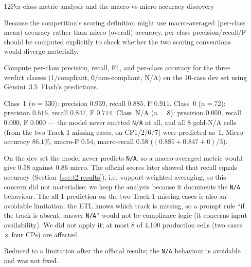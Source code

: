 \begin{explog}{12}{Per-class metric analysis and the macro-vs-micro accuracy discovery}
\item[Hypothesis] Because the competition's scoring definition might use macro-averaged (per-class mean) accuracy rather than micro (overall) accuracy, per-class precision/recall/F should be computed explicitly to check whether the two scoring conventions would diverge materially.
\item[Method] Compute per-class precision, recall, F1, and per-class accuracy for the three verdict classes (1/compliant, 0/non-compliant, N/A) on the 10-case dev set using Gemini~3.5~Flash's predictions.
\item[Result] Class~1 ($n=330$): precision $0.939$, recall $0.885$, F $0.911$. Class~0 ($n=72$): precision $0.616$, recall $0.847$, F $0.714$. Class~N/A ($n=8$): precision $0.000$, recall $0.000$, F $0.000$ --- the model never emitted \texttt{N/A} at all, and all 8 gold-N/A cells (from the two Track-1-missing cases, on CP1/2/6/7) were predicted as~1. Micro-accuracy $86.1\%$, macro-F $0.54$, macro-recall $0.58$ ($(0.885+0.847+0)/3$).
\item[Inference] On the dev set the model never predicts \texttt{N/A}, so a macro-averaged metric would give $0.58$ against $0.86$ micro. The official scores later showed that recall equals accuracy (Section~\ref{sec:t2-results}), i.e.\ support-weighted averaging, so this concern did not materialise; we keep the analysis because it documents the \texttt{N/A} behaviour. The all-1 prediction on the two Track-1-missing cases is also an avoidable limitation: the ETL knows which track is missing, so a prompt rule ``if the track is absent, answer \texttt{N/A}'' would not be compliance logic (it concerns input availability). We did not apply it; at most 8 of 4{,}100 production cells (two cases $\times$ four CPs) are affected.
\item[Verdict] Reduced to a limitation after the official results; the \texttt{N/A} behaviour is avoidable and was not fixed.
\end{explog}


